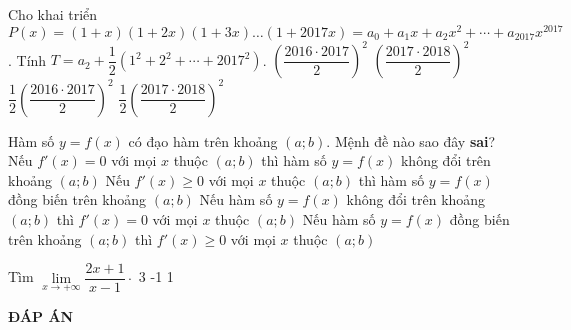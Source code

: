 \begin{ex}%
	Cho khai triển 
	$P(x)=\left(1+x\right)\left(1+2x\right)\left(1+3x\right) \ldots  \left(1+2017x\right)=a_0+a_1x+a_2x^2+\cdots+a_{2017}x^{2017}$. 
	Tính $T=a_2+\dfrac{1}{2}\left(1^2+2^2+\cdots+2017^2\right)$. 
	\choice
	{${\left(\dfrac{2016\cdot 2017}{2}\right)}^2$}
	{${\left(\dfrac{2017\cdot 2018}{2}\right)}^2$}
	{$\dfrac{1}{2}{\left(\dfrac{2016\cdot 2017}{2}\right)}^2$}
	{\True $\dfrac{1}{2}{\left(\dfrac{2017\cdot 2018}{2}\right)}^2$}
\end{ex}
\begin{ex}%
	Hàm số $y=f(x)$ có đạo hàm trên khoảng $\left(a;b\right)$. Mệnh đề nào sao đây \textbf{sai}?
	\choice
	{Nếu $f'(x)=0$ với mọi $x$ thuộc $\left(a;b\right)$ thì hàm số $y=f(x)$ không đổi trên khoảng $\left(a; b\right)$}
	{\True Nếu $f'(x)\ge 0$ với mọi $x$ thuộc $\left(a;b\right)$ thì hàm số $y=f(x)$ đồng biến trên khoảng $\left(a; b\right)$}
	{Nếu hàm số $y=f(x)$ không đổi trên khoảng $\left(a;b\right)$ thì $f'(x)=0$ với mọi $x$ thuộc $\left(a;b\right)$}
	{Nếu hàm số $y=f(x)$ đồng biến trên khoảng $\left(a; b\right)$ thì ${f}'(x)\ge 0$ với mọi $x$ thuộc $\left(a;b\right)$}
\end{ex}
\begin{ex}%
	Tìm $\underset{x\to+\infty}{\mathop{\lim}}\dfrac{2x+1}{x-1}\cdot $
	\choice
	{}
	{3}
	{-1}
	{1}
\end{ex}


\newpage
\begin{center}
\textbf{ĐÁP ÁN}
\end{center}
\begin{multicols}{10}
 
\end{multicols}
